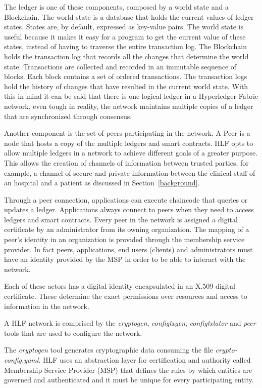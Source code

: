 The ledger is one of these components, composed by a world state and a
Blockchain. The world state is a database that holds the current values of
ledger states. States are, by default, expressed as key-value pairs. The world
state is useful because it makes it easy for a program to get the current value
of these states, instead of having to traverse the entire transaction log. The
Blockchain holds the transaction log that records all the changes that
determine the world state. Transactions are collected and recorded in an
immutable sequence of blocks. Each block contains a set of ordered
transactions. The transaction logs hold the history of changes that have
resulted in the current world state. With this in mind it can be said that
there is one logical ledger in a Hyperledger Fabric network, even tough in
reality, the network maintains multiple copies of a ledger that are
synchronized through consensus. 

Another component is the set of peers participating in the network. A Peer is a
node that hosts a copy of the multiple ledgers and smart contracts. HLF opts to
allow multiple ledgers in a network to achieve different goals of a greater
purpose. This allows the creation of channels of information between trusted
parties, for example, a channel of secure and private information between the
clinical staff of an hospital and a patient as discussed in
Section~\ref{background}. 

Through a peer connection, applications can execute chaincode that queries or
updates a ledger. Applications always connect to peers when they need to access
ledgers and smart contracts. Every peer in the network is assigned a digital
certificate by an administrator from its owning organization. The mapping of a
peer's identity in an organization is provided through the membership service
provider. In fact peers, applications, end users (clients) and administrators
must have an identity provided by the MSP in order to be able to interact with
the network.

Each of these actors has a digital identity encapsulated in an X.509 digital
certificate. These determine the exact permissions over resources and access to
information in the network.


A HLF network is comprised by the \textit{cryptogen}, \textit{configtxgen},
\textit{configtxlator} and \textit{peer} tools that are used to configure the
network.

The \textit{cryptogen} tool generates cryptographic data consuming the file
\textit{crypto-config.yaml}.  HLF uses an abstraction layer for certification
and authority called Membership Service Provider (MSP) that defines the rules
by which entities are governed and authenticated and it must be unique for
every participating entity.

